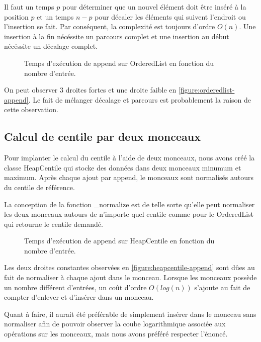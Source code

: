 \documentclass[french]{article}
\begin{document}
Il faut un temps $p$ pour déterminer que un nouvel élément doit être inséré à la
position $p$ et un temps $n - p$ pour décaler les éléments qui suivent l'endroit
ou l'insertion se fait. Par conséquent, la complexité est toujours d'ordre
$O(n)$. Une insertion à la fin nécéssite un parcours complet et une insertion au
début nécéssite un décalage complet.

\begin{figure}
  \centering
  \caption{Temps d'exécution de \textsf{append} sur \textsf{OrderedList} en fonction du nombre d'entrée.}
  \label{figure:orderedlist-append}
  
\end{figure}

On peut observer 3 droites fortes et une droite faible en
\autoref{figure:orderedlist-append}. Le fait de mélanger décalage et parcours
est probablement la raison de cette observation.

\subsection{Calcul de centile par deux monceaux}
Pour implanter le calcul du centile à l'aide de deux monceaux, nous avons créé
la classe \textsf{HeapCentile} qui stocke des données dans deux monceaux minumum
et maximum. Après chaque ajout par \textsf{append}, le monceaux sont normalisés
autours du centile de référence.

La conception de la fonction \textsf{\_normalize} est de telle sorte qu'elle
peut normaliser les deux monceaux autours de n'importe quel centile comme pour
le \textsf{OrderedList} qui retourne le centile demandé.

\begin{figure}
  \centering
  \caption{Temps d'exécution de \textsf{append} sur \textsf{HeapCentile} en fonction du nombre d'entrée.}
  \label{figure:heapcentile-append}
  
\end{figure}

Les deux droites constantes observées en \autoref{figure:heapcentile-append}
sont dûes au fait de normaliser à chaque ajout dans le monceau. Lorsque les
monceaux possède un nombre différent d'entrées, un coût d'ordre $O(log(n))$
s'ajoute au fait de compter d'enlever et d'insérer dans un monceau.

Quant à faire, il aurait été préférable de simplement insérer dans le monceau
sans normaliser afin de pouvoir observer la coube logarithmique associée aux
opérations sur les monceaux, mais nous avons préféré respecter l'énoncé.
\end{document}

